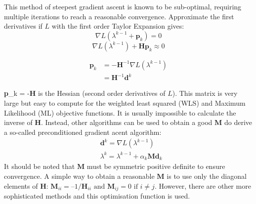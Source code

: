 \documentclass{article}
\begin{document}
This method of steepest gradient ascent is known to be sub-optimal, requiring multiple iterations to reach a reasonable convergence. Approximate the first derivatives if $L$ with the first order Taylor Expansion gives:
\begin{equation}
\nabla L(\lambda^{k-1} + \textbf{p}_k ) = 0
\end{equation}
\begin{equation}
\nabla L(\lambda^{k-1}) + \textbf{H}\textbf{p}_k \approx  0
\end{equation}

\begin{equation}
\begin{split}
\textbf{p}_k &= -\textbf{H}^{-1} \nabla L(\lambda^{k-1}) \\
&= \textbf{H}^{-1} \textbf{d}^k
\end{split}
\end{equation}

\textbf{p}_k = -$\textbf{H}$ is the Hessian (second order derivatives of $L$). This matrix is very large but easy to compute for the weighted least squared (WLS) and Maximum Likelihood (ML) objective functions. It is usually impossible to calculate the inverse of $\textbf{H}$. Instead, other algorithms can be used to obtain a good $\textbf{M}$ do derive a so-called preconditioned gradient acent algorithm:
\begin{equation}
\begin{split}
& \textbf{d}^k = \nabla L(\lambda^{k-1})\\
& \lambda^k = \lambda^{k-1} + \alpha_k \textbf{M}\textbf{d}_k
\end{split}
\end{equation}
It should be noted that $\textbf{M}$ must be symmetric positive definite to ensure convergence. A simple way to obtain a reasonable $\textbf{M}$ is to use only the diagonal elements of $\textbf{H}$: $\textbf{M}_{ii} = –1/\textbf{H}_{ii} \text{ and } \textbf{M}_{ij} = 0 \text{ if } i \neq j$. However, there are other more sophisticated methods and this optimisation function is used.
\end{document}
